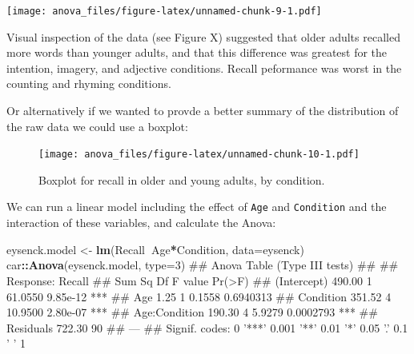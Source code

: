 \documentclass[]{article}
\newenvironment{Shaded}{\begin{snugshade}}{\end{snugshade}}
\newcommand{\KeywordTok}[1]{\textcolor[rgb]{0.13,0.29,0.53}{\textbf{#1}}}
\newcommand{\DataTypeTok}[1]{\textcolor[rgb]{0.13,0.29,0.53}{#1}}
\newcommand{\DecValTok}[1]{\textcolor[rgb]{0.00,0.00,0.81}{#1}}
\newcommand{\StringTok}[1]{\textcolor[rgb]{0.31,0.60,0.02}{#1}}
\newcommand{\OperatorTok}[1]{\textcolor[rgb]{0.81,0.36,0.00}{\textbf{#1}}}
\newcommand{\NormalTok}[1]{#1}
\theoremstyle{definition}
\theoremstyle{definition}
\theoremstyle{definition}
\theoremstyle{remark}
\begin{document}
\texttt{[image: anova\_files/figure-latex/unnamed-chunk-9-1.pdf]}

{Visual inspection of the data (see Figure X) suggested that older
adults recalled more words than younger adults, and that this difference
was greatest for the intention, imagery, and adjective conditions.
Recall peformance was worst in the counting and rhyming conditions.}

Or alternatively if we wanted to provde a better summary of the
distribution of the raw data we could use a boxplot:

\begin{Shaded}
\end{Shaded}

\begin{figure}
\centering
\texttt{[image: anova\_files/figure-latex/unnamed-chunk-10-1.pdf]}
\caption{\label{fig:unnamed-chunk-10}Boxplot for recall in older and young
adults, by condition.}
\end{figure}

We can run a linear model including the effect of \texttt{Age} and
\texttt{Condition} and the interaction of these variables, and calculate
the Anova:

\begin{Shaded}
\begin{Highlighting}[]
\NormalTok{eysenck.model <-}\StringTok{ }\KeywordTok{lm}\NormalTok{(Recall}\OperatorTok{~}\NormalTok{Age}\OperatorTok{*}\NormalTok{Condition, }\DataTypeTok{data=}\NormalTok{eysenck)}
\NormalTok{car}\OperatorTok{::}\KeywordTok{Anova}\NormalTok{(eysenck.model, }\DataTypeTok{type=}\DecValTok{3}\NormalTok{)}
\NormalTok{## Anova Table (Type III tests)}
\NormalTok{## }
\NormalTok{## Response: Recall}
\NormalTok{##               Sum Sq Df F value    Pr(>F)    }
\NormalTok{## (Intercept)   490.00  1 61.0550  9.85e-12 ***}
\NormalTok{## Age             1.25  1  0.1558 0.6940313    }
\NormalTok{## Condition     351.52  4 10.9500  2.80e-07 ***}
\NormalTok{## Age:Condition 190.30  4  5.9279 0.0002793 ***}
\NormalTok{## Residuals     722.30 90                      }
\NormalTok{## ---}
\NormalTok{## Signif. codes:  0 '***' 0.001 '**' 0.01 '*' 0.05 '.' 0.1 ' ' 1}
\end{Highlighting}
\end{Shaded}
\end{document}
